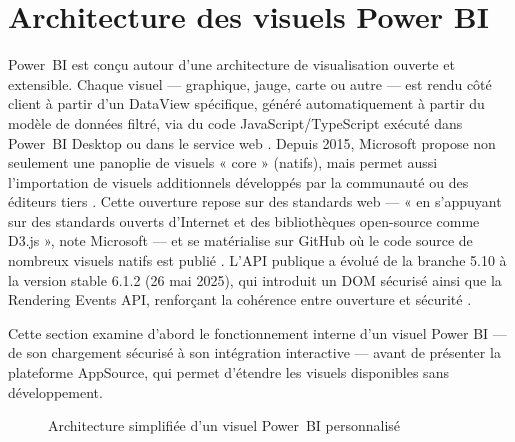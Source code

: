 \section{Architecture des visuels Power BI}
\label{sec:archi-powerbi}

Power~BI est conçu autour d’une architecture de visualisation ouverte et extensible.  
Chaque visuel — graphique, jauge, carte ou autre — est rendu côté client à partir d’un DataView spécifique, généré automatiquement à partir du modèle de données filtré, via du code JavaScript/TypeScript exécuté dans Power~BI Desktop ou dans le service web \parencite{MicrosoftOpenVis2015}.  
Depuis 2015, Microsoft propose non seulement une panoplie de visuels « core » (natifs), mais permet aussi l’importation de visuels additionnels développés par la communauté ou des éditeurs tiers \parencite{MicrosoftMarketplace2016}.  
Cette ouverture repose sur des standards web — « en s’appuyant sur des standards ouverts d’Internet et des bibliothèques open-source comme D3.js », note Microsoft \parencite{MicrosoftD3Blog2017} — et se matérialise sur GitHub où le code source de nombreux visuels natifs est publié \parencite{GitHubPowerBISamples2024}.  
L’API publique a évolué de la branche 5.10 à la version stable 6.1.2 (26 mai 2025), qui introduit un DOM sécurisé ainsi que la Rendering Events API, renforçant la cohérence entre ouverture et sécurité \parencite{MicrosoftApiChangelog2025}.

Cette section examine d’abord le fonctionnement interne d’un visuel Power BI — de son chargement sécurisé à son intégration interactive — avant de présenter la plateforme AppSource, qui permet d’étendre les visuels disponibles sans développement.

\begin{figure}[h]
  \centering
  \caption{Architecture simplifiée d’un visuel Power~BI personnalisé}
  \label{fig:archi-visuel}
\end{figure}

